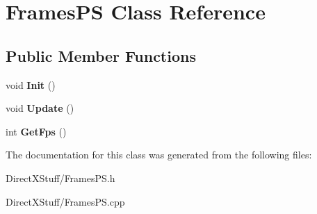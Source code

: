 \hypertarget{class_frames_p_s}{\section{Frames\-P\-S Class Reference}
\label{class_frames_p_s}
}
\subsection*{Public Member Functions}
\begin{DoxyCompactItemize}
\item 
\hypertarget{class_frames_p_s_aa2d2b5c32d90d773f2f19d822a8c9401}{void {\bfseries Init} ()}\label{class_frames_p_s_aa2d2b5c32d90d773f2f19d822a8c9401}

\item 
\hypertarget{class_frames_p_s_a325edcb4dd167543cee7764c4a50392f}{void {\bfseries Update} ()}\label{class_frames_p_s_a325edcb4dd167543cee7764c4a50392f}

\item 
\hypertarget{class_frames_p_s_a2c0db3596b63fc609b8c28085a09810b}{int {\bfseries Get\-Fps} ()}\label{class_frames_p_s_a2c0db3596b63fc609b8c28085a09810b}

\end{DoxyCompactItemize}


The documentation for this class was generated from the following files\-:\begin{DoxyCompactItemize}
\item 
Direct\-X\-Stuff/Frames\-P\-S.\-h\item 
Direct\-X\-Stuff/Frames\-P\-S.\-cpp\end{DoxyCompactItemize}
